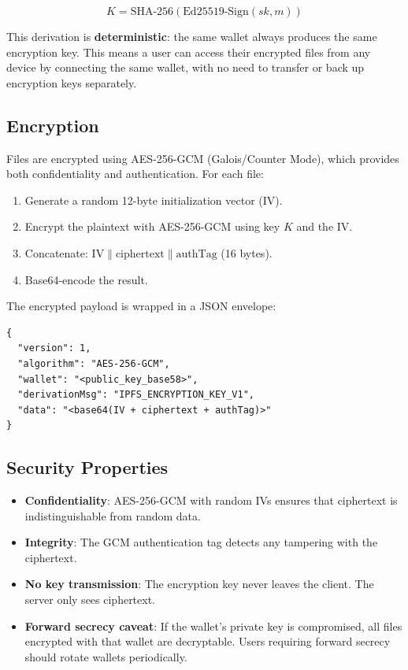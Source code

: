 \documentclass[11pt,a4paper]{article}
\begin{document}
\begin{equation}
    K = \text{SHA-256}(\text{Ed25519-Sign}(sk, m))
\end{equation}

This derivation is \textbf{deterministic}: the same wallet always produces the same encryption key. This means a user can access their encrypted files from any device by connecting the same wallet, with no need to transfer or back up encryption keys separately.

\subsection{Encryption}

Files are encrypted using AES-256-GCM (Galois/Counter Mode), which provides both confidentiality and authentication. For each file:

\begin{enumerate}
    \item Generate a random 12-byte initialization vector (IV).
    \item Encrypt the plaintext with AES-256-GCM using key $K$ and the IV.
    \item Concatenate: $\text{IV} \| \text{ciphertext} \| \text{authTag}$ (16 bytes).
    \item Base64-encode the result.
\end{enumerate}

The encrypted payload is wrapped in a JSON envelope:

\begin{verbatim}
{
  "version": 1,
  "algorithm": "AES-256-GCM",
  "wallet": "<public_key_base58>",
  "derivationMsg": "IPFS_ENCRYPTION_KEY_V1",
  "data": "<base64(IV + ciphertext + authTag)>"
}
\end{verbatim}

\subsection{Security Properties}

\begin{itemize}
    \item \textbf{Confidentiality}: AES-256-GCM with random IVs ensures that ciphertext is indistinguishable from random data.
    \item \textbf{Integrity}: The GCM authentication tag detects any tampering with the ciphertext.
    \item \textbf{No key transmission}: The encryption key never leaves the client. The server only sees ciphertext.
    \item \textbf{Forward secrecy caveat}: If the wallet's private key is compromised, all files encrypted with that wallet are decryptable. Users requiring forward secrecy should rotate wallets periodically.
\end{itemize}
\end{document}
